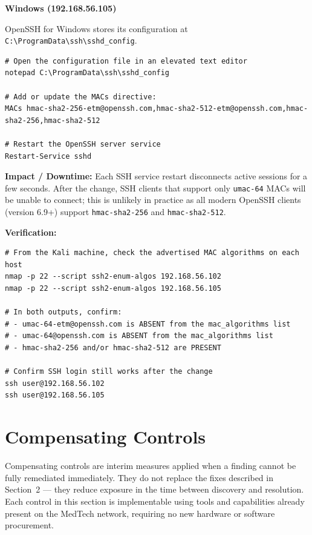 \documentclass[12pt]{article}
\begin{document}
\bigskip
\noindent\textbf{Windows (192.168.56.105)}
 
OpenSSH for Windows stores its configuration at
\texttt{C:\textbackslash ProgramData\textbackslash ssh\textbackslash sshd\_config}.
 
\begin{lstlisting}[style=terminal]
# Open the configuration file in an elevated text editor
notepad C:\ProgramData\ssh\sshd_config
 
# Add or update the MACs directive:
MACs hmac-sha2-256-etm@openssh.com,hmac-sha2-512-etm@openssh.com,hmac-sha2-256,hmac-sha2-512
 
# Restart the OpenSSH server service
Restart-Service sshd
\end{lstlisting}
 
\begin{impactbox}
\textbf{Impact / Downtime:} Each SSH service restart disconnects active
sessions for a few seconds. After the change, SSH clients that support only
\texttt{umac-64} MACs will be unable to connect; this is unlikely in practice
as all modern OpenSSH clients (version 6.9+) support \texttt{hmac-sha2-256}
and \texttt{hmac-sha2-512}.
\end{impactbox}
 
\newpage
 
\begin{verifybox}
\textbf{Verification:}
\begin{lstlisting}[style=terminal]
# From the Kali machine, check the advertised MAC algorithms on each host
nmap -p 22 --script ssh2-enum-algos 192.168.56.102
nmap -p 22 --script ssh2-enum-algos 192.168.56.105
 
# In both outputs, confirm:
# - umac-64-etm@openssh.com is ABSENT from the mac_algorithms list
# - umac-64@openssh.com is ABSENT from the mac_algorithms list
# - hmac-sha2-256 and/or hmac-sha2-512 are PRESENT
 
# Confirm SSH login still works after the change
ssh user@192.168.56.102
ssh user@192.168.56.105
\end{lstlisting}
\end{verifybox}

\section{Compensating Controls}
Compensating controls are interim measures applied when a finding cannot be
fully remediated immediately. They do not replace the fixes described in
Section~2 --- they reduce exposure in the time between discovery and
resolution. Each control in this section is implementable using tools and
capabilities already present on the MedTech network, requiring no new hardware
or software procurement.
 
\end{document}
